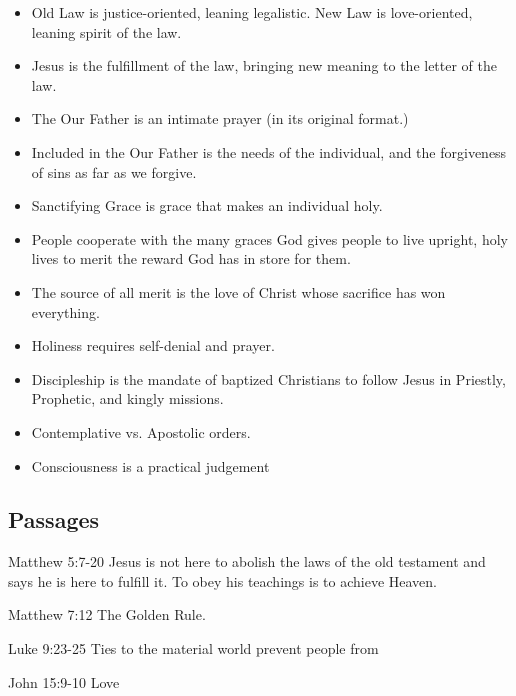 \documentclass[11pt]{article}
\begin{document}
\begin{itemize}
	\item Old Law is justice-oriented, leaning legalistic.  New Law 
		is love-oriented,	leaning spirit of the law.
	\item Jesus is the fulfillment of the law, bringing new meaning 
		to the letter	of the law.
	\item The Our Father is an intimate prayer (in its original 
		format.)
	\item Included in the Our Father is the needs of the individual,
		and	the forgiveness of sins as far as we forgive.
	\item Sanctifying Grace is grace that makes an individual holy.
	\item People cooperate with the many graces God gives people 
		to live upright, holy lives to merit the reward God has in 
		store	for them.
	\item The source of all merit is the love of Christ whose 
		sacrifice has won everything.
	\item Holiness requires self-denial and prayer.
	\item Discipleship is the mandate of baptized Christians to 
		follow Jesus in Priestly, Prophetic, and kingly missions.
	\item Contemplative vs. Apostolic orders.
	\item Consciousness is a practical judgement
\end{itemize}
\subsection{Passages}
Matthew 5:7-20 
	Jesus is not here to abolish the laws of the old 
	testament	and says he is here to fulfill it.  To obey his
	teachings is to achieve Heaven.

Matthew 7:12
	The Golden Rule.

Luke 9:23-25
	Ties to the material world prevent people from 

John 15:9-10
	Love
\end{document}
